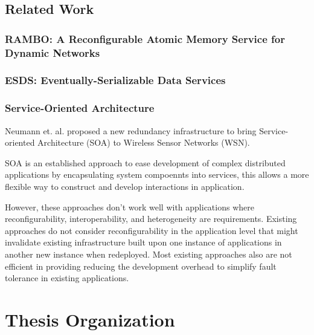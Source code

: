 \subsection{Related Work}

\subsubsection{RAMBO: A Reconfigurable Atomic Memory Service for Dynamic
  Networks}

\subsubsection{ESDS: Eventually-Serializable Data Services}

\subsubsection{Service-Oriented Architecture}

Neumann et. al.\cite{Neumann2010} proposed a new redundancy infrastructure to
bring Service-oriented Architecture (SOA) to Wireless Sensor Networks (WSN).

SOA is an established approach to ease development of complex distributed
applications by encapsulating system compoennts into services, this allows a more
flexible way to construct and develop interactions in application.

However, these approaches don't work well with applications where
reconfigurability, interoperability, and heterogeneity are requirements.
Existing approaches do not consider reconfigurability in the
application level that might invalidate existing infrastructure built upon one
instance of applications in another new instance when redeployed.
Most existing approaches also are not efficient in providing reducing the
development overhead to simplify fault tolerance in existing applications.

\section{Thesis Organization}

